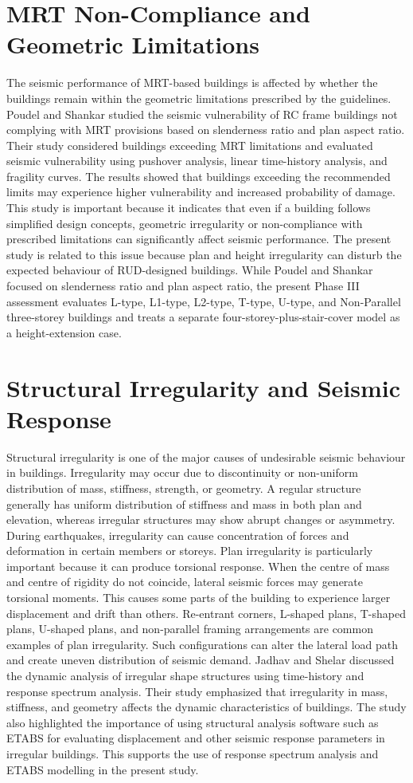 \section{MRT Non-Compliance and Geometric Limitations}
The seismic performance of MRT-based buildings is affected by whether the buildings remain within the geometric limitations prescribed by the guidelines. Poudel and Shankar \cite{poudel2017seismic} studied the seismic vulnerability of RC frame buildings not complying with MRT provisions based on slenderness ratio and plan aspect ratio. Their study considered buildings exceeding MRT limitations and evaluated seismic vulnerability using pushover analysis, linear time-history analysis, and fragility curves. The results showed that buildings exceeding the recommended limits may experience higher vulnerability and increased probability of damage.
This study is important because it indicates that even if a building follows simplified design concepts, geometric irregularity or non-compliance with prescribed limitations can significantly affect seismic performance. The present study is related to this issue because plan and height irregularity can disturb the expected behaviour of RUD-designed buildings. While Poudel and Shankar focused on slenderness ratio and plan aspect ratio, the present Phase III assessment evaluates L-type, L1-type, L2-type, T-type, U-type, and Non-Parallel three-storey buildings and treats a separate four-storey-plus-stair-cover model as a height-extension case.
\section{Structural Irregularity and Seismic Response}
Structural irregularity is one of the major causes of undesirable seismic behaviour in buildings. Irregularity may occur due to discontinuity or non-uniform distribution of mass, stiffness, strength, or geometry. A regular structure generally has uniform distribution of stiffness and mass in both plan and elevation, whereas irregular structures may show abrupt changes or asymmetry. During earthquakes, irregularity can cause concentration of forces and deformation in certain members or storeys.
Plan irregularity is particularly important because it can produce torsional response. When the centre of mass and centre of rigidity do not coincide, lateral seismic forces may generate torsional moments. This causes some parts of the building to experience larger displacement and drift than others. Re-entrant corners, L-shaped plans, T-shaped plans, U-shaped plans, and non-parallel framing arrangements are common examples of plan irregularity. Such configurations can alter the lateral load path and create uneven distribution of seismic demand.
Jadhav and Shelar \cite{jadhav2025study} discussed the dynamic analysis of irregular shape structures using time-history and response spectrum analysis. Their study emphasized that irregularity in mass, stiffness, and geometry affects the dynamic characteristics of buildings. The study also highlighted the importance of using structural analysis software such as ETABS for evaluating displacement and other seismic response parameters in irregular buildings. This supports the use of response spectrum analysis and ETABS modelling in the present study.
